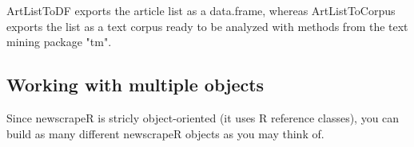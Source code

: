 \documentclass[a4paper,11pt]{article}\usepackage{graphicx, color}
\begin{document}
ArtListToDF exports the article list as a data.frame, whereas ArtListToCorpus exports the list as a text corpus ready to be analyzed with methods from the text mining package "tm".

\subsection{Working with multiple objects}

Since newscrapeR is stricly object-oriented (it uses R reference classes), you can build as many different newscrapeR objects as you may think of. 
\end{document}
